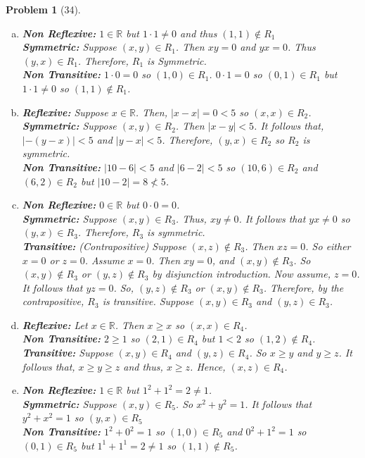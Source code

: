 \documentclass{article}
\theoremstyle{problem}
\newtheorem{prob}{Problem}
\theoremstyle{plain}
\theoremstyle{remark}
\begin{document}
\begin{prob}[34]\ \\[-1cm]
\begin{multicols}{2}
\begin{enumerate}[a)]
\item \textbf{Non Reflexive:} $1 \in \mathbb{R}$ but $1 \cdot 1 \not = 0$ and thus $(1,1) \not \in R_1$\\
  \textbf{Symmetric:} Suppose $(x,y) \in R_1$. Then $xy = 0$ and $yx = 0$. Thus $(y,x) \in R_1$. Therefore, $R_1$ is Symmetric.\\
  \textbf{Non Transitive:} $1 \cdot 0 = 0$ so $(1,0) \in R_1$. $0 \cdot 1 = 0$ so $(0,1) \in R_1$ but $1 \cdot 1 \not = 0$ so $(1,1) \not \in R_1$.
\item \textbf{Reflexive:} Suppose $x \in \mathbb{R}$. Then, $|x - x| = 0 < 5$ so $(x,x) \in R_2$.\\
  \textbf{Symmetric:} Suppose $(x,y) \in R_2$. Then $|x - y| < 5$. It follows that, $|-(y - x)| < 5$ and $|y - x| < 5$. Therefore, $(y,x) \in R_2$ so $R_2$ is symmetric.\\
  \textbf{Non Transitive:} $|10 - 6| < 5$ and $|6 - 2| < 5$ so $(10,6) \in R_2$ and $(6,2) \in R_2$ but $|10 - 2| = 8 \not < 5$.
\item \textbf{Non Reflexive:} $0 \in \mathbb{R}$ but $0 \cdot 0 = 0$.\\
\textbf{Symmetric:} Suppose $(x,y) \in R_3$. Thus, $xy \not = 0$. It follows that $yx \not = 0$ so $(y,x) \in R_3$. Therefore, $R_3$ is symmetric.\\
\textbf{Transitive:} (Contrapositive) Suppose $(x,z) \not \in R_3$. Then $xz = 0$. So either $x = 0$ or $z = 0$. Assume $x = 0$. Then $xy = 0$, and $(x,y) \not \in R_3$. So $(x,y) \not \in R_3$ or $(y,z) \not \in R_3$ by disjunction introduction. Now assume, $z = 0$. It follows that $yz = 0$. So, $(y,z) \not \in R_3$ or $(x,y) \not \in R_3$. Therefore, by the contrapositive, $R_3$ is transitive.
Suppose $(x,y) \in R_3$ and $(y,z) \in R_3$.
\item \textbf{Reflexive:} Let $x \in \mathbb{R}$. Then $x \geq x$ so $(x,x) \in R_4$.\\
  \textbf{Non Transitive:} $2 \geq 1$ so $(2,1) \in R_4$ but $1 < 2$ so $(1,2) \not \in R_4$.\\
  \textbf{Transitive:} Suppose $(x,y) \in R_4$ and $(y,z) \in R_4$. So $x \geq y$ and $y \geq z$. It follows that, $x \geq y \geq z$ and thus, $x \geq z$. Hence, $(x,z) \in R_4$.
\item \textbf{Non Reflexive:} $1 \in \mathbb{R}$ but $1^2 + 1^2 = 2 \not = 1$.\\
  \textbf{Symmetric:} Suppose $(x,y) \in R_5$. So $x^2 + y^2 = 1$. It follows that $y^2 + x^2 = 1$ so $(y,x) \in R_5$\\
  \textbf{Non Transitive:} $1^2 + 0^2 = 1$ so $(1,0) \in R_5$ and $0^2 + 1^2 = 1$ so $(0,1) \in R_5$ but $1^1 + 1^1 = 2 \not = 1$ so $(1,1) \not \in R_5$.
\end{enumerate}
\end{multicols}
\end{prob}

% 
\end{document}
